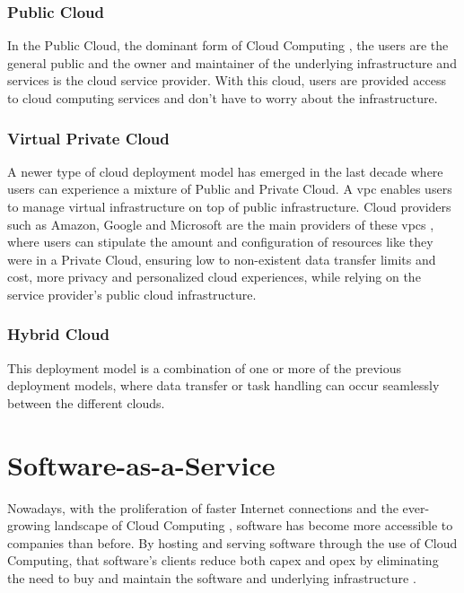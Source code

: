\subsubsection{Public Cloud}\label{state-of-the-art:sss:public-cloud}
In the Public Cloud, the dominant form of Cloud Computing \Parencite{dillon_tharam_and_wu_chen_and_chang_elizabeth}, the users are the general public and the owner and maintainer of the underlying infrastructure and services is the cloud service provider. With this cloud, users are provided access to cloud computing services and don't have to worry about the infrastructure.

\subsubsection{Virtual Private Cloud}\label{state-of-the-art:sss:virtual-private-cloud}
A newer type of cloud deployment model has emerged in the last decade where users can experience a mixture of Public and Private Cloud. A \gls{vpc} enables users to manage virtual infrastructure on top of public infrastructure. Cloud providers such as Amazon, Google and Microsoft are the main providers of these \gls{vpc}s \Parencite{aljamal_el-mousa_jubair_2018}, where users can stipulate the amount and configuration of resources like they were in a Private Cloud, ensuring low to non-existent data transfer limits and cost, more privacy and personalized cloud experiences, while relying on the service provider's public cloud infrastructure.

\subsubsection{Hybrid Cloud}\label{state-of-the-art:sss:hybrid-cloud} 
This deployment model is a combination of one or more of the previous deployment models, where data transfer or task handling can occur seamlessly between the different clouds.

\section{Software-as-a-Service}\label{state-of-the-art:s:software-as-a-service}

Nowadays, with the proliferation of faster Internet connections and the ever-growing landscape of Cloud Computing
\Parencite{dillon_tharam_and_wu_chen_and_chang_elizabeth}, software has become more accessible to companies than before.
By hosting and serving software through the use of Cloud Computing, that software's clients reduce both \gls{capex} and \gls{opex} by eliminating the need to buy and maintain the software and underlying infrastructure \Parencite{alnumay_2020}.

